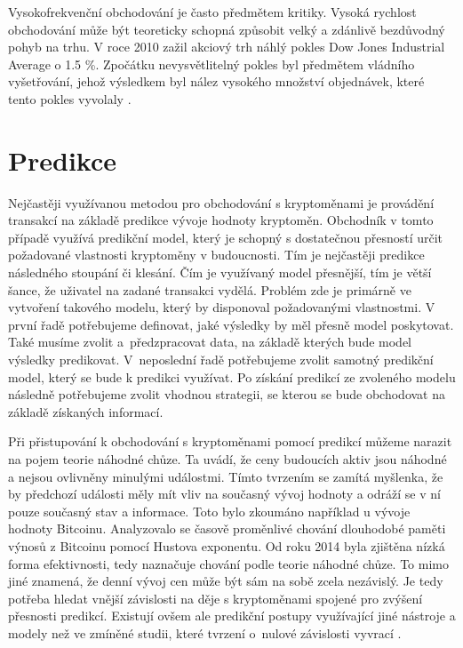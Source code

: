 Vysokofrekvenční obchodování je často předmětem kritiky. Vysoká rychlost obchodování může být teoreticky schopná způsobit velký a zdánlivě bezdůvodný pohyb na trhu. 
V roce 2010 zažil akciový trh náhlý pokles Dow Jones Industrial Average o 1.5 \%. 
Zpočátku nevysvětlitelný pokles byl předmětem vládního vyšetřování, jehož výsledkem byl nález vysokého množství objednávek, které tento pokles vyvolaly \cite{investigation-hft}.

\section{Predikce}

Nejčastěji využívanou metodou pro obchodování s kryptoměnami je provádění transakcí na základě predikce vývoje hodnoty kryptoměn. 
Obchodník v tomto případě využívá predikční model, který je schopný s dostatečnou přesností určit požadované vlastnosti kryptoměny v budoucnosti. 
Tím je nejčastěji predikce následného stoupání či klesání. 
Čím je využívaný model přesnější, tím je větší šance, že uživatel na zadané transakci vydělá. 
Problém zde je primárně ve vytvoření takového modelu, který by disponoval požadovanými vlastnostmi. 
V první řadě potřebujeme definovat, jaké výsledky by měl přesně model poskytovat. 
Také musíme zvolit a~předzpracovat data, na základě kterých bude model výsledky predikovat. 
V~neposlední řadě potřebujeme zvolit samotný predikční model, který se bude k predikci využívat. 
Po získání predikcí ze zvoleného modelu následně potřebujeme zvolit vhodnou strategii, se kterou se bude obchodovat na základě získaných informací.

Při přistupování k obchodování s kryptoměnami pomocí predikcí můžeme narazit na pojem teorie náhodné chůze. 
Ta uvádí, že ceny budoucích aktiv jsou náhodné a nejsou ovlivněny minulými událostmi. 
Tímto tvrzením se zamítá myšlenka, že by předchozí události měly mít vliv na současný vývoj hodnoty a odráží se v ní pouze současný stav a informace. 
Toto bylo zkoumáno například u vývoje hodnoty Bitcoinu. 
Analyzovalo se časově proměnlivé chování dlouhodobé paměti výnosů z Bitcoinu pomocí Hustova exponentu. 
Od roku 2014 byla zjištěna nízká forma efektivnosti, tedy naznačuje chování podle teorie náhodné chůze. 
To mimo jiné znamená, že denní vývoj cen může být sám na sobě zcela nezávislý.
Je tedy potřeba hledat vnější závislosti na děje s kryptoměnami spojené pro zvýšení přesnosti predikcí. 
Existují ovšem ale predikční postupy využívající jiné nástroje a modely než ve zmíněné studii, které tvrzení o~nulové závislosti vyvrací \cite{random-walk}.

